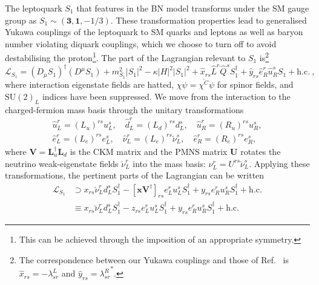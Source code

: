 The leptoquark $S_{1}$ that features in the BN model transforms under the SM
gauge group as $S_{1} \sim (\mathbf{3}, \mathbf{1}, -1/3)$. These transformation
properties lead to generalised Yukawa couplings of the leptoquark to SM quarks
and leptons as well as baryon number violating diquark couplings, which we choose
to turn off to avoid destabilising the proton\footnote{This can be achieved
  through the imposition of an appropriate symmetry.}. The part of the
Lagrangian relevant to $S_{1}$ is\footnote{The correspondence between our Yukawa
  couplings and those of Ref.~\cite{Bauer:2015knc} is
  $\hat{x}_{rs} = -\lambda^L_{sr}$ and $\hat{y}_{rs} = {\lambda^R_{sr}}^{*}$.}
\begin{equation}
  \label{eq:ch3-Lagra}
  \mathscr{L}_{S_{1}} = (D_\mu S_{1})^\dagger (D^\mu S_{1}) + m_{S_1}^2 |S_{1}|^2 - \kappa |H|^2 |S_{1}|^2 + \hat{x}_{rs} \hat{L}^r \hat{Q}^s S_{1}^\dagger
  + \hat{y}_{rs} \hat{e}_R^r \hat{u}_R^s S_{1} + \text{h.c.} \ ,
\end{equation}
where interaction eigenstate fields are hatted,
$\chi \psi = \overline{\chi^C} \psi$ for spinor fields, and $\mathrm{SU}(2)_L$
indices have been suppressed. We move from the interaction to the
charged-fermion mass basis through the unitary transformations
\begin{equation}
  \label{eq:ch3-smfermion-mixing}
  \begin{split}
    \hat{u}_L^r = (L_u)^{rs} u_L^s, \quad \hat{d}_L^r = (L_d)^{rs} d_L^s, \quad \hat{u}^r_R = (R_u)^{rs} u^s_R,\\
    \hat{e}_L^r = (L_e)^{rs} e_L^s, \quad \hat{\nu}_L^r = (L_e)^{rs} \breve{\nu}_L^s, \quad \hat{e}_R^r = (R_e)^{rs} e_R^s,
  \end{split}
\end{equation}
where $\mathbf{V} = \mathbf{L}_u^\dagger \mathbf{L}_d$ is the CKM matrix and the
PMNS matrix $\mathbf{U}$ rotates the neutrino weak-eigenstate fields
$\breve{\nu}_L^r$ into the mass basis: $\nu_L^r = U^{rs} \breve{\nu}_L^s$.
Applying these transformations, the pertinent parts of the Lagrangian can be
written
\begin{equation}
  \begin{split}
    \label{eq:ch3-Lagray}
    \mathscr{L}_{S_{1}} &\supset x_{rs} \breve{\nu}_L^r d_L^s S_{1}^\dagger - [\mathbf{x} \mathbf{V}^\dagger]_{rs} e_L^r u_L^s S_{1}^\dagger + y_{rs} e_R^r u_R^s S^{\dagger}_{1} + \text{h.c.}\\
    &\equiv x_{rs} \breve{\nu}_L^r d_L^s S_{1}^\dagger - z_{rs} e_L^r u_L^s S_{1}^\dagger + y_{rs}
    e_R^r u_R^s S^{\dagger}_{1} + \text{h.c.}
  \end{split}
\end{equation}
